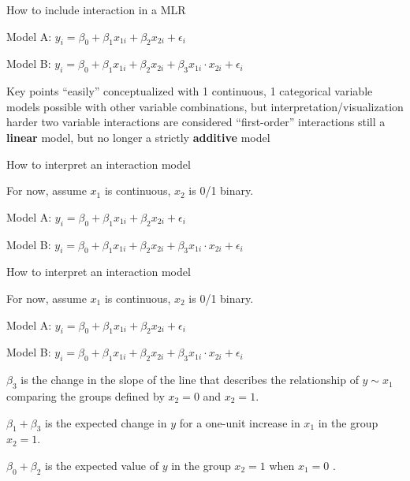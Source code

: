 \documentclass[table]{beamer}\usepackage[]{graphicx}\usepackage[]{color}
\begin{document}
%
%
%

\begin{frame}{How to include interaction in a MLR}


Model A: $ y_i = \beta_0 + \beta_1 x_{1i} + \beta_2 x_{2i} + \epsilon_i$


Model B: $ y_i = \beta_0 + \beta_1 x_{1i} + \beta_2 x_{2i} + \beta_3 x_{1i}\cdot x_{2i} + \epsilon_i$

\vspace{4em}

\begin{block}{Key points}
\bi
        \myitem ``easily'' conceptualized with 1 continuous, 1 categorical variable
        \myitem models possible with other variable combinations, but interpretation/visualization harder
        \myitem two variable interactions are considered ``first-order'' interactions
        \myitem still a {\bf linear} model, but no longer a strictly {\bf additive} model
\ei
\end{block}

\end{frame}



\begin{frame}{How to interpret an interaction model}

For now, assume $x_1$ is continuous, $x_2$ is 0/1 binary.

Model A: $ y_i = \beta_0 + \beta_1 x_{1i} + \beta_2 x_{2i} + \epsilon_i$

Model B: $ y_i = \beta_0 + \beta_1 x_{1i} + \beta_2 x_{2i} + \beta_3 x_{1i}\cdot x_{2i} + \epsilon_i$

\vspace{12em}

\end{frame}



\begin{frame}{How to interpret an interaction model}

For now, assume $x_1$ is continuous, $x_2$ is 0/1 binary.

Model A: $ y_i = \beta_0 + \beta_1 x_{1i} + \beta_2 x_{2i} + \epsilon_i$

Model B: $ y_i = \beta_0 + \beta_1 x_{1i} + \beta_2 x_{2i} + \beta_3 x_{1i}\cdot x_{2i} + \epsilon_i$

\vspace{1em}

$\beta_3$ is the change in the slope of the line that describes the relationship of $y \sim x_1$ comparing the groups defined by $x_2=0$ and $x_2=1$.

$\beta_1 + \beta_3$ is the expected change in $y$ for a one-unit increase in $x_1$ in the group $x_2=1$.

$\beta_0 + \beta_2$ is the expected value of $y$ in the group $x_2=1$ when $x_1=0$ .


\end{frame}
\end{document}
